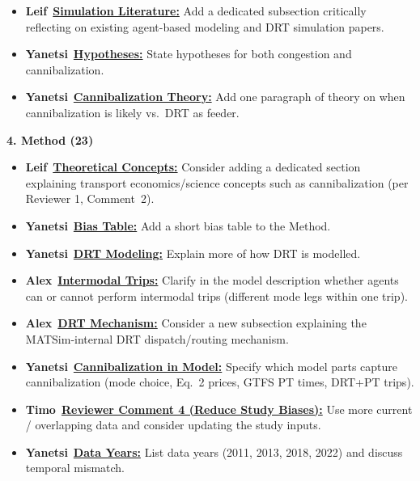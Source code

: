 \documentclass[preprint,12pt,authoryear]{elsarticle}
\newcommand{\todobadge}[2]{\colorbox{#1}{\textbf{\scriptsize #2}}}
\newcommand{\badgeTimo}{\todobadge{orange!30}{Timo}}
\newcommand{\badgeLeif}{\todobadge{yellow!40}{Leif}}
\newcommand{\badgeAlex}{\todobadge{blue!25}{Alex}}
\newcommand{\badgeYanetsi}{\todobadge{purple!30}{Yanetsi}}
\begin{document}
\begin{itemize}
  \item[$\square$] \badgeLeif\ \hyperlink{todo:lit-sim-subsec}{\textbf{Simulation Literature:}} Add a dedicated subsection critically reflecting on existing agent-based modeling and DRT simulation papers.
  \item[$\square$] \badgeYanetsi\ \hyperlink{todo:lit-yanetsi-hyp}{\textbf{Hypotheses:}} State hypotheses for both congestion and cannibalization.
  \item[$\square$] \badgeYanetsi\ \hyperlink{todo:lit-yanetsi-theory}{\textbf{Cannibalization Theory:}} Add one paragraph of theory on when cannibalization is likely vs.\ DRT as feeder.
\end{itemize}

\noindent\textbf{4. Method (23)}
\begin{itemize}\setlength{\itemsep}{1pt}\setlength{\parskip}{0pt}\setlength{\parsep}{0pt}
  \item[$\square$] \badgeLeif\ \hyperlink{todo:method-concepts}{\textbf{Theoretical Concepts:}} Consider adding a dedicated section explaining transport economics/science concepts such as cannibalization (per Reviewer 1, Comment~2).
  \item[$\square$] \badgeYanetsi\ \hyperlink{todo:method-yanetsi-bias}{\textbf{Bias Table:}} Add a short bias table to the Method.
  \item[$\square$] \badgeYanetsi\ \hyperlink{todo:method-yanetsi-drt-mod}{\textbf{DRT Modeling:}} Explain more of how DRT is modelled.
  \item[$\square$] \badgeAlex\ \hyperlink{todo:method-intermodal}{\textbf{Intermodal Trips:}} Clarify in the model description whether agents can or cannot perform intermodal trips (different mode legs within one trip).
  \item[$\square$] \badgeAlex\ \hyperlink{todo:method-drt-mech}{\textbf{DRT Mechanism:}} Consider a new subsection explaining the MATSim-internal DRT dispatch/routing mechanism.
  \item[$\square$] \badgeYanetsi\ \hyperlink{todo:method-yanetsi-cannib}{\textbf{Cannibalization in Model:}} Specify which model parts capture cannibalization (mode choice, Eq.~2 prices, GTFS PT times, DRT+PT trips).
  \item[$\square$] \badgeTimo\ \hyperlink{todo:method-rev4-data}{\textbf{Reviewer Comment 4 (Reduce Study Biases):}} Use more current / overlapping data and consider updating the study inputs.
  \item[$\square$] \badgeYanetsi\ \hyperlink{todo:method-yanetsi-years}{\textbf{Data Years:}} List data years (2011, 2013, 2018, 2022) and discuss temporal mismatch.

\end{itemize}
\end{document}
